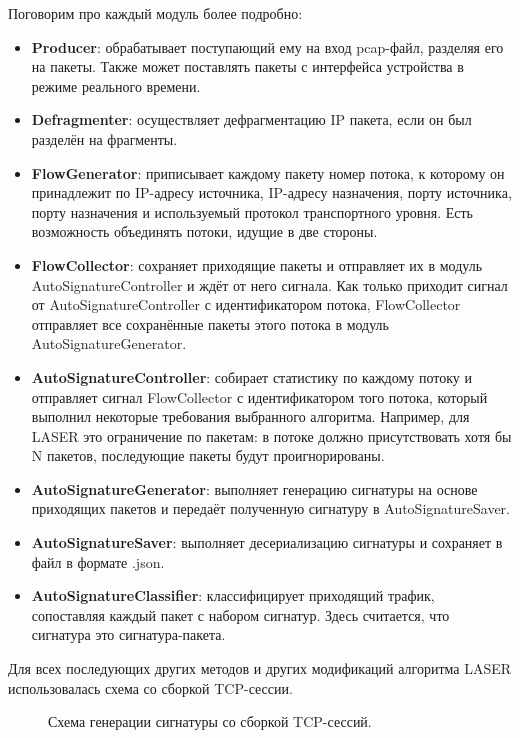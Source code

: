 Поговорим про каждый модуль более подробно:

\begin{itemize}
    \item \textbf{Producer}: обрабатывает поступающий ему на вход pcap-файл, разделяя его на пакеты.
    Также может поставлять пакеты с интерфейса устройства в режиме реального времени.
    \item \textbf{Defragmenter}: осуществляет дефрагментацию IP пакета, если он был разделён на фрагменты.
    \item \textbf{FlowGenerator}: приписывает каждому пакету номер потока, к которому он принадлежит по
    IP-адресу источника, IP-адресу назначения, порту источника, порту назначения и используемый протокол транспортного уровня. Есть возможность объединять потоки, идущие в две стороны.
    \item \textbf{FlowCollector}: сохраняет приходящие пакеты и отправляет их в модуль \\ AutoSignatureController и ждёт от него сигнала.
    Как только приходит сигнал от AutoSignatureController с идентификатором потока, FlowCollector отправляет все сохранённые пакеты этого потока в модуль AutoSignatureGenerator.
    \item \textbf{AutoSignatureController}: собирает статистику по каждому потоку и отправляет сигнал FlowCollector с идентификатором того потока,
    который выполнил некоторые требования выбранного алгоритма.
    Например, для LASER это ограничение по пакетам: в потоке должно присутствовать хотя бы N пакетов, последующие пакеты будут проигнорированы.
    \item \textbf{AutoSignatureGenerator}: выполняет генерацию сигнатуры на основе приходящих пакетов и передаёт полученную сигнатуру в AutoSignatureSaver.
    \item \textbf{AutoSignatureSaver}: выполняет десериализацию сигнатуры и сохраняет в файл в формате .json.
    \item \textbf{AutoSignatureClassifier}: классифицирует приходящий трафик, сопоставляя каждый пакет с набором сигнатур. Здесь считается, что сигнатура это сигнатура-пакета.
\end{itemize}

Для всех последующих других методов и других модификаций алгоритма LASER использовалась схема со сборкой TCP-сессии.

\begin{figure}[H]
    \begin{center}
        
        \caption{Схема генерации сигнатуры со сборкой TCP-сессий.}
    \end{center}
\end{figure}

